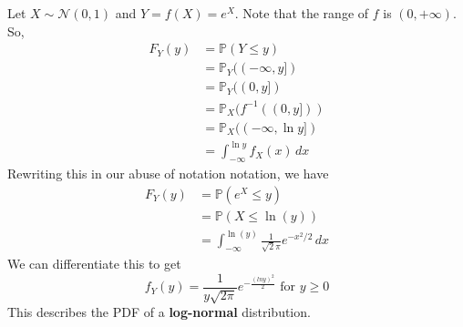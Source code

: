 \documentclass{article}
\begin{document}
      \begin{example}
        Let $X \sim \mathcal{N}(0, 1)$ and $Y = f(X) = e^X$. Note that the range of $f$ is $(0, +\infty)$. So, 
        \begin{align*}
          F_Y (y) & = \mathbb{P}(Y \leq y) \\
          & = \mathbb{P}_Y ((-\infty, y]) \\
          & = \mathbb{P}_Y ( (0, y]) \\ 
          & = \mathbb{P}_X ( f^{-1} ((0, y]) ) \\
          & = \mathbb{P}_X ( (-\infty, \ln{y}] ) \\
          & = \int_{-\infty}^{\ln{y}} f_X (x)\,dx 
        \end{align*}
        Rewriting this in our abuse of notation notation, we have 
        \begin{align*}
          F_Y (y) & = \mathbb{P}(e^X \leq y) \\
          & = \mathbb{P}(X \leq \ln(y)) \\ 
          & = \int_{-\infty}^{\ln(y)} \frac{1}{\sqrt{2} \pi} e^{-x^2/ 2} \,dx 
        \end{align*}
        We can differentiate this to get 
        \begin{equation}
          f_Y (y) = \frac{1}{y \sqrt{2 \pi}} e^{-\frac{(ln{y})^2}{2}} \text{ for } y \geq 0
        \end{equation}
        This describes the PDF of a \textbf{log-normal} distribution. 
      \end{example}
\end{document}
